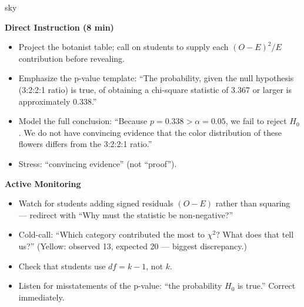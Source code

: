 \documentclass[10pt]{article}
\begin{document}
\begin{skillbox}{sky}
\begin{minipage}[t]{0.48\linewidth}
    \textbf{Direct Instruction (8 min)}
    \begin{itemize}
        \item Project the botanist table; call on students to supply each
              $(O - E)^2 / E$ contribution before revealing.
        \item Emphasize the p-value template: ``The probability, given the null
              hypothesis (3:2:2:1 ratio) is true, of obtaining a chi-square
              statistic of 3.367 or larger is approximately 0.338.''
        \item Model the full conclusion: ``Because $p = 0.338 > \alpha = 0.05$,
              we fail to reject $H_0$. We do not have convincing evidence that
              the color distribution of these flowers differs from the
              3:2:2:1 ratio.''
        \item Stress: ``convincing evidence'' (not ``proof'').
    \end{itemize}
\end{minipage}
\hfill
\begin{minipage}[t]{0.48\linewidth}
    \textbf{Active Monitoring}
    \begin{itemize}
        \item Watch for students adding signed residuals $(O - E)$ rather than
              squaring --- redirect with ``Why must the statistic be non-negative?''
        \item Cold-call: ``Which category contributed the most to $\chi^2$?
              What does that tell us?'' (Yellow: observed 13, expected 20 ---
              biggest discrepancy.)
        \item Check that students use $df = k - 1$, not $k$.
        \item Listen for misstatements of the p-value: ``the probability
              $H_0$ is true.'' Correct immediately.
    \end{itemize}
\end{minipage}
\end{skillbox}
\end{document}
